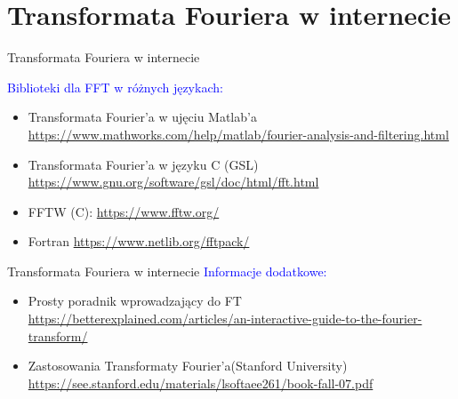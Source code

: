 \section{Transformata Fouriera w internecie}
\begin{frame}{Transformata Fouriera w internecie}

\textcolor{blue}{Biblioteki dla FFT w różnych językach:}
	\begin{itemize}
\item Transformata Fourier'a w ujęciu Matlab'a
\url{https://www.mathworks.com/help/matlab/fourier-analysis-and-filtering.html}

\item Transformata Fourier'a w języku C (GSL) 
\url{https://www.gnu.org/software/gsl/doc/html/fft.html}

\item FFTW (C):
\url{https://www.fftw.org/}

\item Fortran
\url{https://www.netlib.org/fftpack/}
	\end{itemize}
\end{frame}

\begin{frame}{Transformata Fouriera w internecie}
	\textcolor{blue}{Informacje dodatkowe:}
	\begin{itemize}
		\item Prosty poradnik wprowadzający do FT
		\url{https://betterexplained.com/articles/an-interactive-guide-to-the-fourier-transform/}
		\item Zastosowania Transformaty Fourier'a(Stanford University)
		\url{https://see.stanford.edu/materials/lsoftaee261/book-fall-07.pdf}
	\end{itemize}
\end{frame}